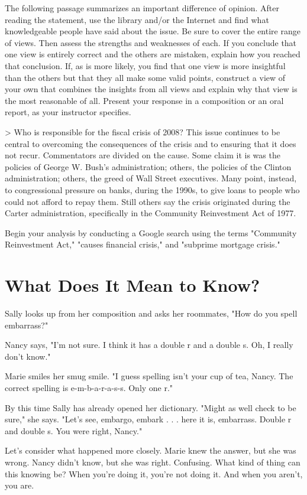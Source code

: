 \documentclass{book}
\begin{document}
The following passage summarizes an important difference of opinion. After reading the statement, use the library and/or the Internet and find what knowledgeable people have said about the issue. Be sure to cover the entire range of views. Then assess the strengths and weaknesses of each. If you conclude that one view is entirely correct and the others are mistaken, explain how you reached that conclusion. If, as is more likely, you find that one view is more insightful than the others but that they all make some valid points, construct a view of your own that combines the insights from all views and explain why that view is the most reasonable of all. Present your response in a composition or an oral report, as your instructor specifies.

> Who is responsible for the fiscal crisis of 2008? This issue continues to be central to overcoming the consequences of the crisis and to ensuring that it does not recur. Commentators are divided on the cause. Some claim it is was the policies of George W. Bush’s administration; others, the policies of the Clinton administration; others, the greed of Wall Street executives. Many point, instead, to congressional pressure on banks, during the 1990s, to give loans to people who could not afford to repay them. Still others say the crisis originated during the Carter administration, specifically in the Community Reinvestment Act of 1977.

Begin your analysis by conducting a Google search using the terms "Community Reinvestment Act," "causes financial crisis," and "subprime mortgage crisis."

\chapter{What Does It Mean to Know?}

Sally looks up from her composition and asks her roommates, "How do you spell embarrass?"

Nancy says, "I’m not sure. I think it has a double r and a double s. Oh, I really don’t know."

Marie smiles her smug smile. "I guess spelling isn’t your cup of tea, Nancy. The correct spelling is e-m-b-a-r-a-s-s. Only one r."

By this time Sally has already opened her dictionary. "Might as well check to be sure," she says. "Let’s see, embargo, embark . . . here it is, embarrass. Double r and double s. You were right, Nancy."

Let’s consider what happened more closely. Marie knew the answer, but she was wrong. Nancy didn’t know, but she was right. Confusing. What kind of thing can this knowing be? When you’re doing it, you’re not doing it. And when you aren’t, you are.
\end{document}
